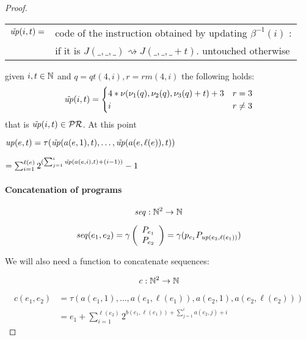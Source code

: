 \begin{theorem}
\begin{proof}
    \begin{center}
      \begin{tabular}{rl}
        $\tilde{\mathit{up}}({i, t})=$ & code of the instruction obtained by updating
                        $\beta^{-1}(i)$ : \\
                      & if it is $J(\_,\_,\_) \rightsquigarrow
                        J(\_,\_,\_ + t)$. untouched otherwise
      \end{tabular}
    \end{center}
    \newcommand{\qt}[1]{\ensuremath{\mathit{qt}({#1})}}
    \newcommand{\rmf}[1]{\ensuremath{\mathit{rm}({#1})}}
    given $i,t \in \mathbb{N}$ and $q=\qt{4,i}, r=\rmf{4,i}$ the following holds:
    \[
      \tilde{\mathit{up}}({i,t}) = \begin{cases}
        4 * \nu(\nu_1(q), \nu_2(q), \nu_3(q) + t) + 3 & r=3 \\
        i & r \neq 3
      \end{cases}
    \]
    that is $\tilde{\mathit{up}}({i,t}) \in \mathcal{PR}$. At this point
    \begin{center}
      $\mathit{up}({e,t}) = \tau(\tilde{\mathit{up}}({a(e,1), t}), \dots, \tilde{\mathit{up}}({a(e, \ell(e)), t}))$

      $= \sum^{\ell(e)}_{i=1}2^{(\sum^i_{j=1}\tilde{\mathit{up}}({a(e,i), t}) + (i-1))}-1$
    \end{center}

    \newcommand{\seq}[1]{\ensuremath{\mathit{seq}({#1})}}
    \paragraph{\textbf{Concatenation of programs}}
    \[
      \mathit{seq} : \mathbb{N}^2 \rightarrow \mathbb{N}
    \]

    \[
      \seq{e_1, e_2} = \gamma \left( \begin{array}{c}
                                P_{e_1} \\
                                P_{e_2}
                              \end{array} \right)
                              = \gamma(p_{e_1} P_{\up{e_2,
                                  \ell(e_1)}})
    \]

    We will also need a function to concatenate sequences:

    \newcommand{\conc}[1]{\ensuremath{\mathit{c}({#1})}}
    \[
      \mathit{c}: \mathbb{N}^2 \rightarrow \mathbb{N}
    \]

    \[
      \begin{aligned}
        \conc{e_1, e_2} &= \tau(a(e_1,1), \dots, a(e_1,\ell(e_1)),
        a(e_2,1), a(e_2, \ell(e_2))) \\
        & = e_1 + \sum\limits^{\ell(e_2)}_{i=1} 2^{b(e_1, \ell(e_1))
          +\sum\limits^i_{j=1}a(e_2,j) + i}
      \end{aligned}
    \]


\end{proof}
\end{theorem}

